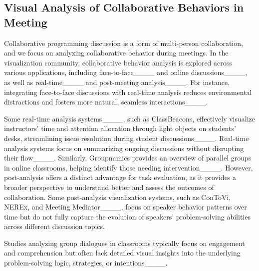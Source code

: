 \subsection{Visual Analysis of Collaborative Behaviors in Meeting}
Collaborative programming discussion is a form of multi-person collaboration, and we focus on analyzing collaborative behavior during meetings.
In the visualization community, collaborative behavior analysis is explored across various applications, including face-to-face____ and online discussions____, as well as real-time____ and post-meeting analysis____. 
 For instance, integrating face-to-face discussions with real-time analysis reduces environmental distractions and fosters more natural, seamless interactions____. 


Some real-time analysis systems____, such as ClassBeacons, effectively visualize instructors' time and attention allocation through light objects on students' desks, streamlining issue resolution during student discussions____. 
Real-time analysis systems focus on summarizing ongoing discussions without disrupting their flow____. Similarly, Groupnamics provides an overview of parallel groups in online classrooms, helping identify those needing intervention____.
However, post-analysis offers a distinct advantage for task evaluation, as it provides a broader perspective to understand better and assess the outcomes of collaboration.
Some post-analysis visualization systems, such as ConToVi, NEREx, and Meeting Mediator____, focus on speaker behavior patterns over time but do not fully capture the evolution of speakers' problem-solving abilities across different discussion topics. 

Studies analyzing group dialogues in classrooms typically focus on engagement and comprehension but often lack detailed visual insights into the underlying problem-solving logic, strategies, or intentions____.
